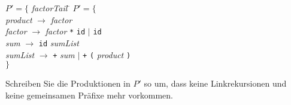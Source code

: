 \documentclass{uebungsblatt}
\begin{document}
\begin{loesung}

\end{loesung}
\newpage
\begin{aufgabe}
\begin{tabbing}
$P' = \{$ \= \textit{factorTail} \= \kill
$P' = \{$ \\
\> \textit{product}    \> $\rightarrow$ \textit{factor} \\
\> \textit{factor}     \> $\rightarrow$ \textit{factor} \texttt{*} \texttt{id} $|$ \texttt{id} \\
\> \textit{sum}        \> $\rightarrow$ \texttt{id} \textit{sumList} \\
\> \textit{sumList}    \> $\rightarrow$ \texttt{+} \textit{sum} $|$ \texttt{+} \texttt{(} \textit{product} \texttt{)} \\
$\}$
\end{tabbing}

Schreiben Sie die Produktionen in $P'$ so um, 
dass keine Linkrekursionen und keine 
gemeinsamen Präfixe mehr vorkommen.\\
\end{aufgabe}
\begin{loesung}

\end{loesung}
\end{document}

